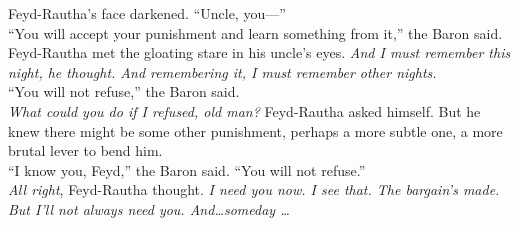 \documentclass[12pt,letterpaper,draft]{memoir}
\begin{document}
Feyd-Rautha’s face darkened. “Uncle, you—”\\
“You will accept your punishment and learn something from it,” the Baron said.\\
Feyd-Rautha met the gloating stare in his uncle’s eyes. \textit{And I must remember this night, he thought. And remembering it, I must remember other nights.}\\
“You will not refuse,” the Baron said.\\
\textit{What could you do if I refused, old man?} Feyd-Rautha asked himself. But he knew there might be some other punishment, perhaps a more subtle one, a more brutal lever to bend him.\\
“I know you, Feyd,” the Baron said. “You will not refuse.”\\
\textit{All right}, Feyd-Rautha thought. \textit{I need you now. I see that. The bargain’s made. But I’ll not always need you. And\ldots someday \ldots} 
\end{document}
